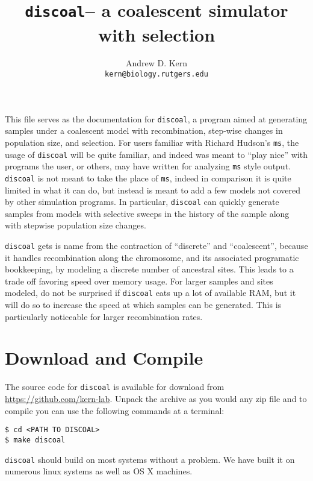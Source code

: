 \documentclass[12pt]{article}
\begin{document}
%
\title{\textbf{\texttt{discoal}}-- a coalescent simulator with selection}
\author{Andrew D. Kern \\
\texttt{kern@biology.rutgers.edu}\\
}


\maketitle

This file serves as the documentation for \texttt{discoal}, a program aimed at generating samples 
under a coalescent model with recombination, step-wise changes in population size, and selection. 
For users familiar with Richard Hudson's \texttt{ms}, the usage of \texttt{discoal} will be quite
familiar, and indeed was meant to ``play nice'' with programs the user, or others, may have written 
for analyzing \texttt{ms} style output. \texttt{discoal} is not meant to take the place of \texttt{ms},
indeed in comparison it is quite limited in what it can do, but instead is meant to add a few models
not covered by other simulation programs. In particular, \texttt{discoal} can quickly generate samples 
from models with selective sweeps in the history of the sample along with stepwise population size
changes. 

\texttt{discoal} gets is name from the contraction of ``discrete'' and ``coalescent'', because it 
handles recombination along the chromosome, and its associated programatic bookkeeping, by modeling 
a discrete number of ancestral sites. This leads to a trade off favoring speed over memory usage. For larger samples
and sites modeled, do not be surprised if \texttt{discoal} eats up a lot of available RAM, but it will
do so to increase the speed at which samples can be generated. This is particularly noticeable for larger 
recombination rates.  

\section*{Download and Compile}
The source code for \texttt{discoal} is available for download from \url{https://github.com/kern-lab}. Unpack the archive as you would any zip file and to compile you can use the following commands at a terminal:

\begin{verbatim}
$ cd <PATH TO DISCOAL>
$ make discoal
\end{verbatim}

\texttt{discoal} should build on most systems without a problem. We have built it on numerous linux systems as
well as OS X machines.  
\end{document}
